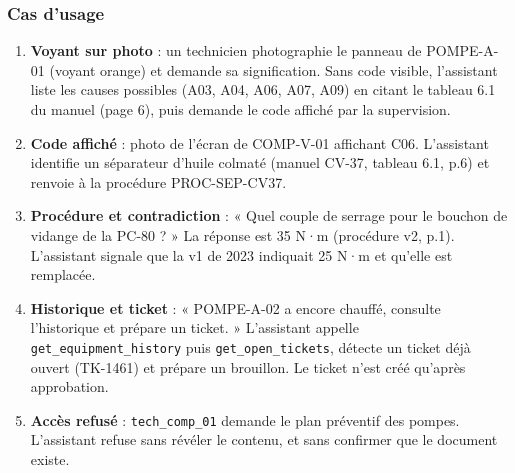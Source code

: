 \documentclass[11pt,a4paper]{article}
\begin{document}
\subsubsection*{Cas d'usage}
\begin{enumerate}[label=\textbf{CU\arabic*}]
\item \textbf{Voyant sur photo} : un technicien photographie le panneau de POMPE-A-01 (voyant orange) et demande sa signification. Sans code visible, l'assistant liste les causes possibles (A03, A04, A06, A07, A09) en citant le tableau 6.1 du manuel (page 6), puis demande le code affiché par la supervision.
\item \textbf{Code affiché} : photo de l'écran de COMP-V-01 affichant C06. L'assistant identifie un séparateur d'huile colmaté (manuel CV-37, tableau 6.1, p.6) et renvoie à la procédure PROC-SEP-CV37.
\item \textbf{Procédure et contradiction} : « Quel couple de serrage pour le bouchon de vidange de la PC-80 ? » La réponse est 35 N·m (procédure v2, p.1). L'assistant signale que la v1 de 2023 indiquait 25 N·m et qu'elle est remplacée.
\item \textbf{Historique et ticket} : « POMPE-A-02 a encore chauffé, consulte l'historique et prépare un ticket. » L'assistant appelle \texttt{get\_equipment\_history} puis \texttt{get\_open\_tickets}, détecte un ticket déjà ouvert (TK-1461) et prépare un brouillon. Le ticket n'est créé qu'après approbation.
\item \textbf{Accès refusé} : \texttt{tech\_comp\_01} demande le plan préventif des pompes. L'assistant refuse sans révéler le contenu, et sans confirmer que le document existe.
\end{enumerate}
\end{document}
